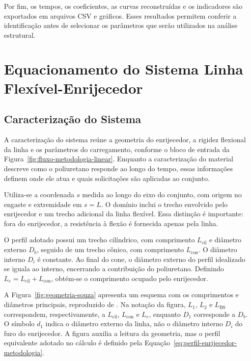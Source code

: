 \documentclass[arial,centeredequations,english,brazilian,oneside,section=TITLE]{ifes8}
\begin{document}
Por fim, os tempos, os coeficientes, as curvas reconstruídas e os indicadores são exportados
em arquivos CSV e gráficos. Esses resultados permitem conferir a identificação antes de
selecionar os parâmetros que serão utilizados na análise estrutural.

\section{Equacionamento do Sistema Linha Flexível-Enrijecedor}
\label{sec:equacionamento-do-sistema}

\subsection{Caracterização do Sistema}
\label{sec:caracterizacao-sistema}

A caracterização do sistema reúne a geometria do enrijecedor, a rigidez flexional da linha
e os parâmetros do carregamento, conforme o bloco de entrada da
Figura~\ref{fig:fluxo-metodologia-linear}. Enquanto a caracterização do material descreve
como o poliuretano responde ao longo do tempo, essas informações definem onde ele atua
e quais solicitações são aplicadas ao conjunto.

Utiliza-se a coordenada $s$ medida ao longo do eixo do conjunto, com origem no engaste e
extremidade em $s=L$. O domínio inclui o trecho envolvido pelo enrijecedor e um trecho
adicional da linha flexível. Essa distinção é importante: fora do enrijecedor, a resistência
à flexão é fornecida apenas pela linha.

O perfil adotado possui um trecho cilíndrico, com comprimento $L_{\mathrm{cil}}$ e diâmetro
externo $D_b$, seguido de um trecho cônico, com comprimento $L_{\mathrm{con}}$. O diâmetro
interno $D_i$ é constante. Ao final do cone, o diâmetro externo do perfil idealizado se
iguala ao interno, encerrando a contribuição do poliuretano. Definindo
$L_e=L_{\mathrm{cil}}+L_{\mathrm{con}}$, obtém-se o comprimento ocupado pelo enrijecedor.

A Figura~\ref{fig:geometria-souza} apresenta um esquema com os comprimentos e diâmetros
principais, reproduzido de . Na notação da figura,
$L_1$, $L_2$ e $L_{\mathrm{BS}}$ correspondem, respectivamente, a
$L_{\mathrm{cil}}$, $L_{\mathrm{con}}$ e $L_e$, enquanto $D_1$ corresponde a $D_b$.
O símbolo $d_1$ indica o diâmetro externo da linha, não o diâmetro interno $D_i$ do furo
do enrijecedor. A figura auxilia a leitura da geometria, mas o perfil equivalente adotado
no cálculo é definido pela Equação~\eqref{eq:perfil-enrijecedor-metodologia}.
\end{document}
